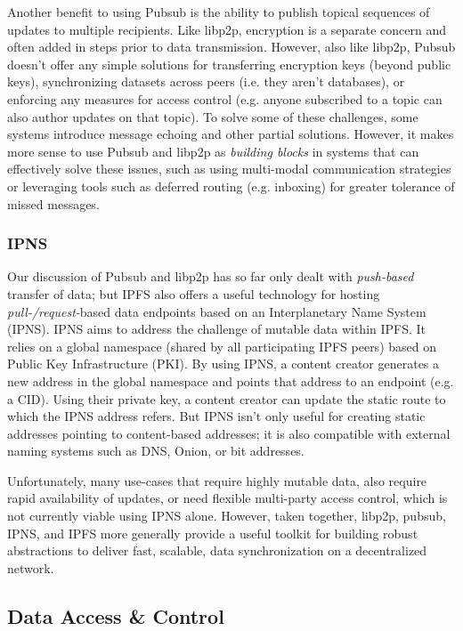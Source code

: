 \documentclass{textile}
\begin{document}
Another benefit to using Pubsub is the ability to publish topical sequences of updates to multiple recipients. Like libp2p, encryption is a separate concern and often added in steps prior to data transmission. However, also like libp2p, Pubsub doesn't offer any simple solutions for transferring encryption keys (beyond public keys), synchronizing datasets across peers (i.e. they aren't databases), or enforcing any measures for access control (e.g. anyone subscribed to a topic can also author updates on that topic). To solve some of these challenges, some systems introduce message echoing and other partial solutions. However, it makes more sense to use Pubsub and libp2p as \emph{building blocks} in systems that can effectively solve these issues, such as using multi-modal communication strategies or leveraging tools such as deferred routing (e.g. inboxing) for greater tolerance of missed messages.

\subsubsection{IPNS}

Our discussion of Pubsub and libp2p has so far only dealt with \emph{push-based} transfer of data; but IPFS also offers a useful technology for hosting \emph{pull-/request-}based data endpoints based on an Interplanetary Name System (IPNS). IPNS aims to address the challenge of mutable data within IPFS. It relies on a global namespace (shared by all participating IPFS peers) based on Public Key Infrastructure (PKI). By using IPNS, a content creator generates a new address in the global namespace and points that address to an endpoint (e.g. a CID). Using their private key, a content creator can update the static route to which the IPNS address refers. But IPNS isn't only useful for creating static addresses pointing to content-based addresses; it is also compatible with external naming systems such as DNS, Onion, or bit addresses.

Unfortunately, many use-cases that require highly mutable data, also require rapid availability of updates, or need flexible multi-party access control, which is not currently viable using IPNS alone. However, taken together, libp2p, pubsub, IPNS, and IPFS more generally provide a useful toolkit for building robust abstractions to deliver fast, scalable, data synchronization on a decentralized network. 

\subsection{Data Access \& Control}
\end{document}
